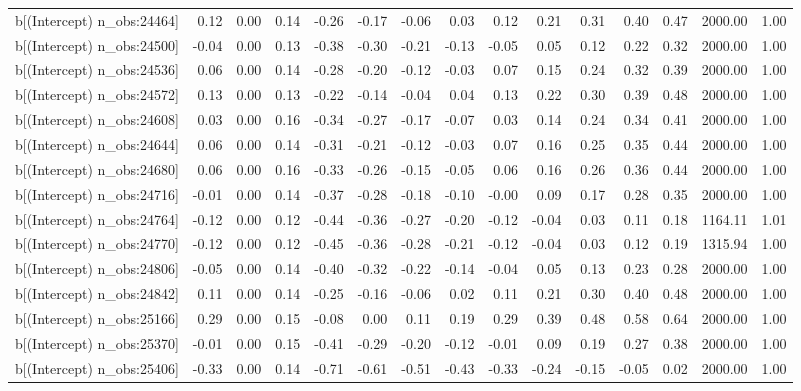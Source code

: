 \begin{table}[ht]
\begin{tabular}{rrrrrrrrrrrrrrr}
  b[(Intercept) n\_obs:24464] & 0.12 & 0.00 & 0.14 & -0.26 & -0.17 & -0.06 & 0.03 & 0.12 & 0.21 & 0.31 & 0.40 & 0.47 & 2000.00 & 1.00 \\ 
  b[(Intercept) n\_obs:24500] & -0.04 & 0.00 & 0.13 & -0.38 & -0.30 & -0.21 & -0.13 & -0.05 & 0.05 & 0.12 & 0.22 & 0.32 & 2000.00 & 1.00 \\ 
  b[(Intercept) n\_obs:24536] & 0.06 & 0.00 & 0.14 & -0.28 & -0.20 & -0.12 & -0.03 & 0.07 & 0.15 & 0.24 & 0.32 & 0.39 & 2000.00 & 1.00 \\ 
  b[(Intercept) n\_obs:24572] & 0.13 & 0.00 & 0.13 & -0.22 & -0.14 & -0.04 & 0.04 & 0.13 & 0.22 & 0.30 & 0.39 & 0.48 & 2000.00 & 1.00 \\ 
  b[(Intercept) n\_obs:24608] & 0.03 & 0.00 & 0.16 & -0.34 & -0.27 & -0.17 & -0.07 & 0.03 & 0.14 & 0.24 & 0.34 & 0.41 & 2000.00 & 1.00 \\ 
  b[(Intercept) n\_obs:24644] & 0.06 & 0.00 & 0.14 & -0.31 & -0.21 & -0.12 & -0.03 & 0.07 & 0.16 & 0.25 & 0.35 & 0.44 & 2000.00 & 1.00 \\ 
  b[(Intercept) n\_obs:24680] & 0.06 & 0.00 & 0.16 & -0.33 & -0.26 & -0.15 & -0.05 & 0.06 & 0.16 & 0.26 & 0.36 & 0.44 & 2000.00 & 1.00 \\ 
  b[(Intercept) n\_obs:24716] & -0.01 & 0.00 & 0.14 & -0.37 & -0.28 & -0.18 & -0.10 & -0.00 & 0.09 & 0.17 & 0.28 & 0.35 & 2000.00 & 1.00 \\ 
  b[(Intercept) n\_obs:24764] & -0.12 & 0.00 & 0.12 & -0.44 & -0.36 & -0.27 & -0.20 & -0.12 & -0.04 & 0.03 & 0.11 & 0.18 & 1164.11 & 1.01 \\ 
  b[(Intercept) n\_obs:24770] & -0.12 & 0.00 & 0.12 & -0.45 & -0.36 & -0.28 & -0.21 & -0.12 & -0.04 & 0.03 & 0.12 & 0.19 & 1315.94 & 1.00 \\ 
  b[(Intercept) n\_obs:24806] & -0.05 & 0.00 & 0.14 & -0.40 & -0.32 & -0.22 & -0.14 & -0.04 & 0.05 & 0.13 & 0.23 & 0.28 & 2000.00 & 1.00 \\ 
  b[(Intercept) n\_obs:24842] & 0.11 & 0.00 & 0.14 & -0.25 & -0.16 & -0.06 & 0.02 & 0.11 & 0.21 & 0.30 & 0.40 & 0.48 & 2000.00 & 1.00 \\ 
  b[(Intercept) n\_obs:25166] & 0.29 & 0.00 & 0.15 & -0.08 & 0.00 & 0.11 & 0.19 & 0.29 & 0.39 & 0.48 & 0.58 & 0.64 & 2000.00 & 1.00 \\ 
  b[(Intercept) n\_obs:25370] & -0.01 & 0.00 & 0.15 & -0.41 & -0.29 & -0.20 & -0.12 & -0.01 & 0.09 & 0.19 & 0.27 & 0.38 & 2000.00 & 1.00 \\ 
  b[(Intercept) n\_obs:25406] & -0.33 & 0.00 & 0.14 & -0.71 & -0.61 & -0.51 & -0.43 & -0.33 & -0.24 & -0.15 & -0.05 & 0.02 & 2000.00 & 1.00 \\ 

\end{tabular}
\end{table}
